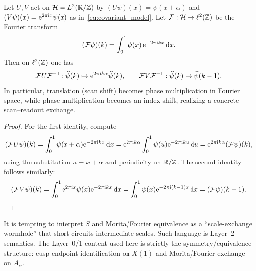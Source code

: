 \begin{proposition}
\label{prop:fourier_exchange_weyl}
Let $U,V$ act on $\mathcal{H}=L^2(\mathbb{R}/\mathbb{Z})$ by $(U\psi)(x)=\psi(x+\alpha)$ and $(V\psi)(x)=\mathrm{e}^{2\pi\mathrm{i} x}\psi(x)$ as in~\eqref{eq:covariant_model}. Let $\mathcal{F}:\mathcal{H}\to \ell^2(\mathbb{Z})$ be the Fourier transform
\begin{equation}
(\mathcal{F}\psi)(k)=\int_0^1 \psi(x)\,\mathrm{e}^{-2\pi\mathrm{i} k x}\,\mathrm{d} x.
\end{equation}
Then on $\ell^2(\mathbb{Z})$ one has
\begin{equation}
\mathcal{F}U\mathcal{F}^{-1}:\widehat\psi(k)\mapsto \mathrm{e}^{2\pi\mathrm{i} k\alpha}\widehat\psi(k),
\qquad
\mathcal{F}V\mathcal{F}^{-1}:\widehat\psi(k)\mapsto \widehat\psi(k-1).
\end{equation}
In particular, translation (scan shift) becomes phase multiplication in Fourier space, while phase multiplication becomes an index shift, realizing a concrete scan--readout exchange.
\end{proposition}
\begin{proof}
For the first identity, compute
\begin{equation}
(\mathcal{F}U\psi)(k)=\int_0^1 \psi(x+\alpha)\mathrm{e}^{-2\pi\mathrm{i} k x}\,\mathrm{d} x
=\mathrm{e}^{2\pi\mathrm{i} k\alpha}\int_0^1 \psi(u)\mathrm{e}^{-2\pi\mathrm{i} k u}\,\mathrm{d} u
=\mathrm{e}^{2\pi\mathrm{i} k\alpha}(\mathcal{F}\psi)(k),
\end{equation}
using the substitution $u=x+\alpha$ and periodicity on $\mathbb{R}/\mathbb{Z}$. The second identity follows similarly:
\begin{equation}
(\mathcal{F}V\psi)(k)=\int_0^1 \mathrm{e}^{2\pi\mathrm{i} x}\psi(x)\mathrm{e}^{-2\pi\mathrm{i} k x}\,\mathrm{d} x
=\int_0^1 \psi(x)\mathrm{e}^{-2\pi\mathrm{i} (k-1)x}\,\mathrm{d} x
=(\mathcal{F}\psi)(k-1).
\end{equation}
\end{proof}

\begin{remark}
It is tempting to interpret $S$ and Morita/Fourier equivalence as a ``scale-exchange wormhole'' that short-circuits intermediate scales. Such language is Layer~2 semantics. The Layer~0/1 content used here is strictly the symmetry/equivalence structure: cusp endpoint identification on $X(1)$ and Morita/Fourier exchange on $A_\alpha$.
\end{remark}


